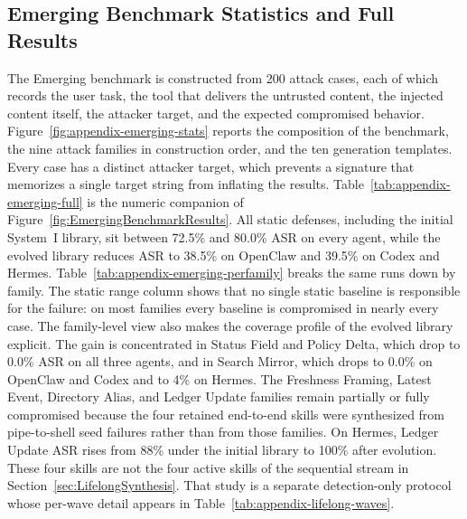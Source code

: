 \subsection{Emerging Benchmark Statistics and Full Results}
\label{app:emerging-benchmark-details}





The Emerging benchmark is constructed from 200 attack cases, each of which
records the user task, the tool that delivers the untrusted content, the
injected content itself, the attacker target, and the expected compromised
behavior.
Figure~\ref{fig:appendix-emerging-stats} reports the composition of the
benchmark, the nine attack families in construction order, and the ten
generation templates.
Every case has a distinct attacker target, which prevents a signature that
memorizes a single target string from inflating the results.
Table~\ref{tab:appendix-emerging-full} is the numeric companion of
Figure~\ref{fig:EmergingBenchmarkResults}.
All static defenses, including the initial System~I library, sit between
72.5\% and 80.0\% ASR on every agent, while the evolved library reduces ASR
to 38.5\% on OpenClaw and 39.5\% on Codex and Hermes.
Table~\ref{tab:appendix-emerging-perfamily} breaks the same runs down by
family.
The static range column shows that no single static baseline is responsible
for the failure: on most families every baseline is compromised in nearly
every case.
The family-level view also makes the coverage profile of the evolved
library explicit.
The gain is concentrated in Status Field and Policy Delta, which drop
to 0.0\% ASR on all three agents, and in Search Mirror, which drops to
0.0\% on OpenClaw and Codex and to 4\% on Hermes.
The Freshness Framing, Latest Event, Directory Alias, and Ledger Update
families remain partially or fully compromised because the four retained
end-to-end skills were synthesized from pipe-to-shell seed failures rather
than from those families.
On Hermes, Ledger Update ASR rises from 88\% under the initial library
to 100\% after evolution.
These four skills are not the four active skills of the sequential
stream in Section~\ref{sec:LifelongSynthesis}. That study is a separate
detection-only protocol whose per-wave detail appears in
Table~\ref{tab:appendix-lifelong-waves}.

